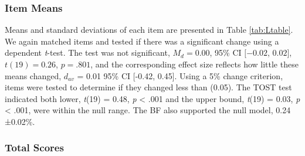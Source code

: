 \documentclass[english,man, mask]{apa6}
\theoremstyle{definition}
\theoremstyle{definition}
\theoremstyle{definition}
\theoremstyle{remark}
\begin{document}
\subsubsection{Item Means}\label{item-means-1}

Means and standard deviations of each item are presented in Table
\ref{tab:Ltable}. We again matched items and tested if there was a
significant change using a dependent \emph{t}-test. The test was not
significant, \(M_d = 0.00\), 95\% CI \([-0.02\), \(0.02]\),
\(t(19) = 0.26\), \(p = .801\), and the corresponding effect size
reflects how little these means changed, \(d_{av}\) = 0.01 95\% CI
{[}-0.42, 0.45{]}. Using a 5\% change criterion, items were tested to
determine if they changed less than (0.05). The TOST test indicated both
lower, \emph{t}(19) = 0.48, \emph{p} \textless{} .001 and the upper
bound, \emph{t}(19) = 0.03, \emph{p} \textless{} .001, were within the
null range. The BF also supported the null model, 0.24 ±0.02\%.

\subsubsection{Total Scores}\label{total-scores-1}
\end{document}
